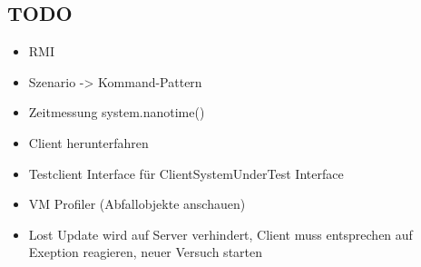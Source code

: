 \subsection{TODO}
\begin{itemize}
\item RMI
\item Szenario -> Kommand-Pattern
\item Zeitmessung system.nanotime()
\item Client herunterfahren
\item Testclient Interface für ClientSystemUnderTest Interface
\item VM Profiler (Abfallobjekte anschauen)
\item Lost Update wird auf Server verhindert, Client muss entsprechen auf Exeption reagieren, neuer Versuch starten
\end{itemize}


